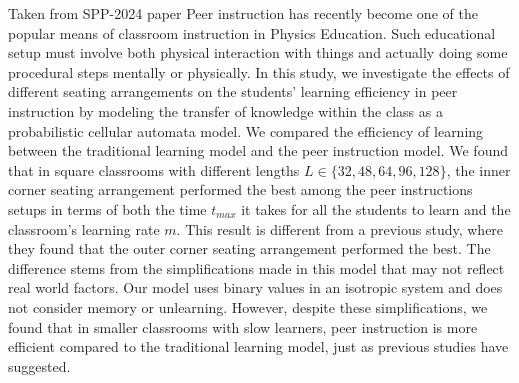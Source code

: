 Taken from SPP-2024 paper
Peer instruction has recently become one of the popular means of classroom instruction in Physics Education. 
Such educational setup must involve both physical interaction with things and actually doing some procedural steps mentally or physically. 
In this study, we investigate the effects of different seating arrangements on the students' learning efficiency in peer instruction by modeling the transfer of knowledge within the class as a probabilistic cellular automata model. 
 We compared the efficiency of learning between the traditional learning model and the peer instruction model. 
 We found that in square classrooms with different lengths $L \in\lbrace32,48,64,96,128\rbrace$, the inner corner seating arrangement performed the best among the peer instructions setups in terms of both the time $t_{max}$ it takes for all the students to learn and the classroom’s learning rate $m$.
 This result is different from a previous study, where they found that the outer corner seating arrangement performed the best. 
 The difference stems from the simplifications made in this model that may not reflect real world factors. Our model uses binary values in an isotropic system and does not consider memory or unlearning. 
 However, despite these simplifications, we found that in smaller classrooms with slow learners, peer instruction is more efficient compared to the traditional learning model, just as previous studies have suggested.

